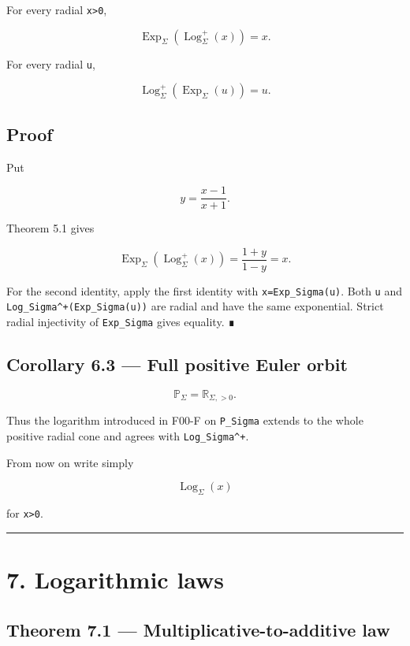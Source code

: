 For every radial \texttt{x\textgreater{}0},

\[
\boxed{
\operatorname{Exp}_\Sigma
(\operatorname{Log}_\Sigma^+(x))
=x.
}
\]

For every radial \texttt{u},

\[
\boxed{
\operatorname{Log}_\Sigma^+
(\operatorname{Exp}_\Sigma(u))
=u.
}
\]

\hypertarget{proof-7}{%
\subsection{Proof}\label{proof-7}}

Put

\[
y=\frac{x-1}{x+1}.
\]

Theorem 5.1 gives

\[
\operatorname{Exp}_\Sigma
(\operatorname{Log}_\Sigma^+(x))
=
\frac{1+y}{1-y}
=x.
\]

For the second identity, apply the first identity with
\texttt{x=Exp\_Sigma(u)}. Both \texttt{u} and \texttt{Log\_Sigma\^{}+(Exp\_Sigma(u))} are radial and have
the same exponential. Strict radial injectivity of \texttt{Exp\_Sigma} gives equality.
∎

\hypertarget{corollary-6.3-full-positive-euler-orbit}{%
\subsection{Corollary 6.3 --- Full positive Euler orbit}\label{corollary-6.3-full-positive-euler-orbit}}

\[
\boxed{
\mathbb P_\Sigma
=
\mathbb R_{\Sigma,>0}.
}
\]

Thus the logarithm introduced in F00-F on \texttt{P\_Sigma} extends to the whole
positive radial cone and agrees with \texttt{Log\_Sigma\^{}+}.

From now on write simply

\[
\operatorname{Log}_\Sigma(x)
\]

for \texttt{x\textgreater{}0}.

\begin{center}\rule{0.5\linewidth}{0.5pt}\end{center}

\hypertarget{logarithmic-laws}{%
\section{7. Logarithmic laws}\label{logarithmic-laws}}

\hypertarget{theorem-7.1-multiplicative-to-additive-law}{%
\subsection{Theorem 7.1 --- Multiplicative-to-additive law}\label{theorem-7.1-multiplicative-to-additive-law}}

